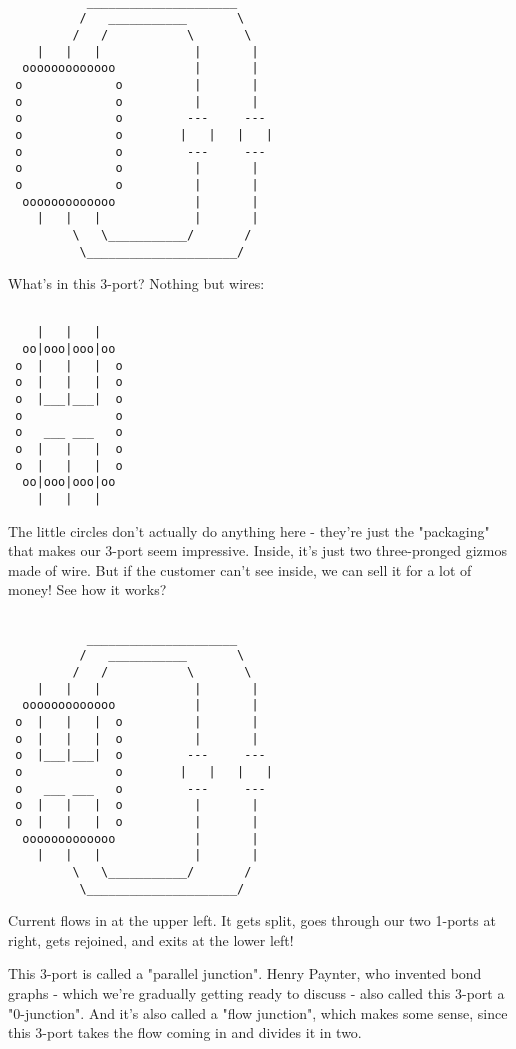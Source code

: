 \begin{verbatim}

           _____________________
          /   ___________       \
         /   /           \       \
    |   |   |             |       |
  ooooooooooooo           |       |
 o             o          |       |
 o             o          |       |
 o             o         ---     ---
 o             o        |   |   |   |
 o             o         ---     ---
 o             o          |       |
 o             o          |       |
  ooooooooooooo           |       |
    |   |   |             |       |
         \   \___________/       /  
          \_____________________/    
\end{verbatim}
    

What's in this 3-port?  Nothing but wires:



\begin{verbatim}

    |   |   |
  oo|ooo|ooo|oo
 o  |   |   |  o
 o  |   |   |  o
 o  |___|___|  o
 o             o
 o   ___ ___   o
 o  |   |   |  o
 o  |   |   |  o
  oo|ooo|ooo|oo
    |   |   |

\end{verbatim}
    

The little circles don't actually do anything here - they're just the
"packaging" that makes our 3-port seem impressive.   Inside, it's
just two three-pronged gizmos made of wire.  But if the customer can't 
see inside, we can sell it for a lot of money!  See how it works?


\begin{verbatim}

           _____________________
          /   ___________       \
         /   /           \       \
    |   |   |             |       |
  ooooooooooooo           |       |
 o  |   |   |  o          |       |
 o  |   |   |  o          |       |
 o  |___|___|  o         ---     ---
 o             o        |   |   |   |
 o   ___ ___   o         ---     ---
 o  |   |   |  o          |       |
 o  |   |   |  o          |       |
  ooooooooooooo           |       |
    |   |   |             |       |
         \   \___________/       /  
          \_____________________/    
\end{verbatim}
    

Current flows in at the upper left.  It gets split, goes through our
two 1-ports at right, gets rejoined, and exits at the lower left!

This 3-port is called a "parallel junction".  Henry Paynter,
who invented bond graphs - which we're gradually getting ready to
discuss - also called this 3-port a "0-junction".  And it's also
called a "flow junction", which makes some sense, since this
3-port takes the flow coming in and divides it in two.

